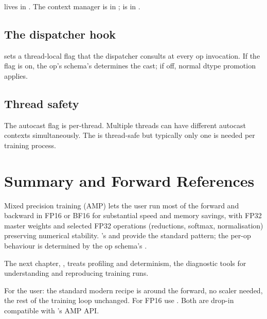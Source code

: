 lives in . The
 context manager is in
;  is in
.

\subsection{The dispatcher hook}
\label{ssec:amp:dispatcher_hook}

 sets a thread-local flag that the dispatcher
consults at every op invocation. If the flag is on, the op's
schema's  determines the cast; if off, normal
dtype promotion applies.

\subsection{Thread safety}
\label{ssec:amp:thread_safety}

The autocast flag is per-thread. Multiple threads can have
different autocast contexts simultaneously. The
 is thread-safe but typically only one is
needed per training process.

\section{Summary and Forward References}
\label{sec:amp:summary}

Mixed precision training (AMP) lets the user run most of the
forward and backward in FP16 or BF16 for substantial speed and
memory savings, with FP32 master weights and selected FP32
operations (reductions, softmax, normalisation) preserving
numerical stability. \Lucid's  and
 provide the standard pattern; the per-op
behaviour is determined by the op schema's .

The next chapter, , treats
profiling and determinism, the diagnostic tools for understanding
and reproducing training runs.

\begin{lucidnote}
For the user: the standard modern recipe is
 around the forward,
no scaler needed, the rest of the training loop unchanged. For
FP16 use . Both are drop-in compatible with
's AMP API.
\end{lucidnote}
